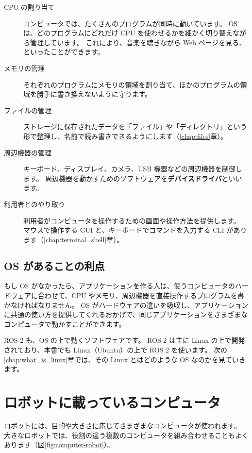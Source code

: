\begin{description}
  \item[CPU の割り当て]
    コンピュータでは、たくさんのプログラムが同時に動いています。
    OS は、どのプログラムにどれだけ CPU を使わせるかを細かく切り替えながら管理しています。
    これにより、音楽を聴きながら Web ページを見る、といったことができます。
  \item[メモリの管理]
    それぞれのプログラムにメモリの領域を割り当て、ほかのプログラムの領域を勝手に書き換えないように守ります。
  \item[ファイルの管理]
    ストレージに保存されたデータを「ファイル」や「ディレクトリ」という形で整理し、名前で読み書きできるようにします（\ref{chap:files}章）。
  \item[周辺機器の管理]
    キーボード、ディスプレイ、カメラ、USB 機器などの周辺機器を制御します。
    周辺機器を動かすためのソフトウェアを\textbf{デバイスドライバ}といいます。
  \item[利用者とのやり取り]
    利用者がコンピュータを操作するための画面や操作方法を提供します。
    マウスで操作する GUI と、キーボードでコマンドを入力する CLI があります（\ref{chap:terminal_shell}章）。
\end{description}

\subsection{OS があることの利点}

もし OS がなかったら、アプリケーションを作る人は、使うコンピュータのハードウェアに合わせて、CPU やメモリ、周辺機器を直接操作するプログラムを書かなければなりません。
OS がハードウェアの違いを吸収し、アプリケーションに共通の使い方を提供してくれるおかげで、同じアプリケーションをさまざまなコンピュータで動かすことができます。

ROS 2 も、OS の上で動くソフトウェアです。
ROS 2 は主に Linux の上で開発されており、本書でも Linux（Ubuntu）の上で ROS 2 を使います。
次の\ref{chap:what_is_linux}章では、その Linux とはどのような OS なのかを見ていきます。

\section{ロボットに載っているコンピュータ}
\label{sec:computer-robot}

ロボットには、目的や大きさに応じてさまざまなコンピュータが使われます。
大きなロボットでは、役割の違う複数のコンピュータを組み合わせることもよくあります（図\ref{fig:computer-robot}）。

